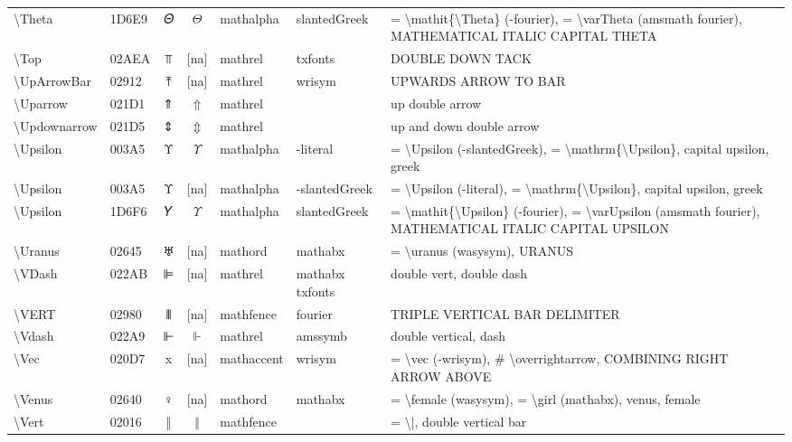 \documentclass[a4paper,landscape]{article}
\begin{document}
\begin{longtable}{llcclll}
\textbackslash{}Theta & 1D6E9 & 𝛩 & $\Theta$ & mathalpha & slantedGreek & = \textbackslash{}mathit\{\textbackslash{}Theta\} (-fourier), = \textbackslash{}varTheta (amsmath fourier), MATHEMATICAL ITALIC CAPITAL THETA \\
\textbackslash{}Top & 02AEA & ⫪ & [na] & mathrel & txfonts & DOUBLE DOWN TACK \\
\textbackslash{}UpArrowBar & 02912 & ⤒ & [na] & mathrel & wrisym & UPWARDS ARROW TO BAR \\
\textbackslash{}Uparrow & 021D1 & ⇑ & $\Uparrow$ & mathrel &  & up double arrow \\
\textbackslash{}Updownarrow & 021D5 & ⇕ & $\Updownarrow$ & mathrel &  & up and down double arrow \\
\textbackslash{}Upsilon & 003A5 & Υ & $\Upsilon$ & mathalpha & -literal & = \textbackslash{}Upsilon (-slantedGreek), = \textbackslash{}mathrm\{\textbackslash{}Upsilon\}, capital upsilon, greek \\
\textbackslash{}Upsilon & 003A5 & Υ & [na] & mathalpha & -slantedGreek & = \textbackslash{}Upsilon (-literal),  = \textbackslash{}mathrm\{\textbackslash{}Upsilon\},  capital upsilon,  greek \\
\textbackslash{}Upsilon & 1D6F6 & 𝛶 & $\Upsilon$ & mathalpha & slantedGreek & = \textbackslash{}mathit\{\textbackslash{}Upsilon\} (-fourier), = \textbackslash{}varUpsilon (amsmath fourier), MATHEMATICAL ITALIC CAPITAL UPSILON \\
\textbackslash{}Uranus & 02645 & \textsf ♅ & [na] & mathord & mathabx & = \textbackslash{}uranus (wasysym),  URANUS \\
\textbackslash{}VDash & 022AB & ⊫ & [na] & mathrel & mathabx txfonts & double vert, double dash \\
\textbackslash{}VERT & 02980 & ⦀ & [na] & mathfence & fourier & TRIPLE VERTICAL BAR DELIMITER \\
\textbackslash{}Vdash & 022A9 & ⊩ & $\Vdash$ & mathrel & amssymb & double vertical, dash \\
\textbackslash{}Vec & 020D7 & x⃗ & [na] & mathaccent & wrisym & = \textbackslash{}vec (-wrisym),  \# \textbackslash{}overrightarrow,  COMBINING RIGHT ARROW ABOVE \\
\textbackslash{}Venus & 02640 & \textsf ♀ & [na] & mathord & mathabx & = \textbackslash{}female (wasysym),  = \textbackslash{}girl (mathabx),  venus,  female \\
\textbackslash{}Vert & 02016 & ‖ & $\Vert$ & mathfence &  & = \textbackslash{}|,  double vertical bar \\

\end{longtable}
\end{document}
